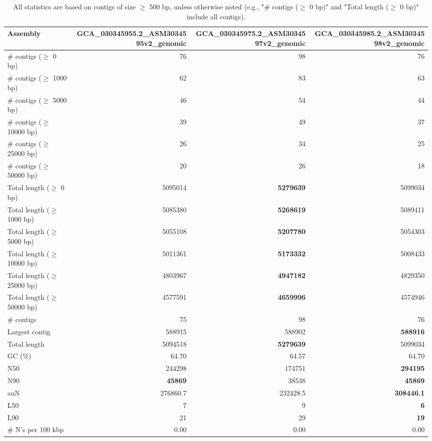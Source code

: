 \documentclass[12pt,a4paper]{article}
\begin{document}
\begin{table}[ht]
\begin{center}
\caption{All statistics are based on contigs of size $\geq$ 500 bp, unless otherwise noted (e.g., "\# contigs ($\geq$ 0 bp)" and "Total length ($\geq$ 0 bp)" include all contigs).}
\begin{tabular}{|l*{3}{|r}|}
\hline
Assembly & GCA\_030345955.2\_ASM3034595v2\_genomic & GCA\_030345975.2\_ASM3034597v2\_genomic & GCA\_030345985.2\_ASM3034598v2\_genomic \\ \hline
\# contigs ($\geq$ 0 bp) & 76 & 98 & 76 \\ \hline
\# contigs ($\geq$ 1000 bp) & 62 & 83 & 63 \\ \hline
\# contigs ($\geq$ 5000 bp) & 46 & 54 & 44 \\ \hline
\# contigs ($\geq$ 10000 bp) & 39 & 49 & 37 \\ \hline
\# contigs ($\geq$ 25000 bp) & 26 & 34 & 25 \\ \hline
\# contigs ($\geq$ 50000 bp) & 20 & 26 & 18 \\ \hline
Total length ($\geq$ 0 bp) & 5095014 & {\bf 5279639} & 5099034 \\ \hline
Total length ($\geq$ 1000 bp) & 5085380 & {\bf 5268619} & 5089411 \\ \hline
Total length ($\geq$ 5000 bp) & 5055108 & {\bf 5207780} & 5054303 \\ \hline
Total length ($\geq$ 10000 bp) & 5011361 & {\bf 5173332} & 5008433 \\ \hline
Total length ($\geq$ 25000 bp) & 4803967 & {\bf 4947182} & 4829350 \\ \hline
Total length ($\geq$ 50000 bp) & 4577591 & {\bf 4659996} & 4574946 \\ \hline
\# contigs & 75 & 98 & 76 \\ \hline
Largest contig & 588915 & 588902 & {\bf 588916} \\ \hline
Total length & 5094518 & {\bf 5279639} & 5099034 \\ \hline
GC (\%) & 64.70 & 64.57 & 64.70 \\ \hline
N50 & 244298 & 174751 & {\bf 294195} \\ \hline
N90 & {\bf 45869} & 38538 & {\bf 45869} \\ \hline
auN & 276860.7 & 232428.5 & {\bf 308446.1} \\ \hline
L50 & 7 & 9 & {\bf 6} \\ \hline
L90 & 21 & 29 & {\bf 19} \\ \hline
\# N's per 100 kbp & 0.00 & 0.00 & 0.00 \\ \hline
\end{tabular}
\end{center}
\end{table}
\end{document}
